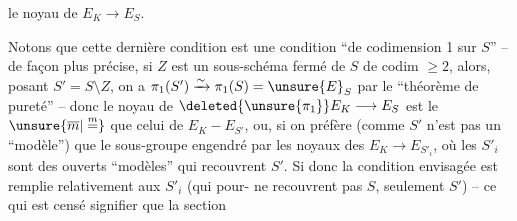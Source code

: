 le noyau de $E_K\longrightarrow E_S$.

Notons que cette dernière condition est une condition ``de codimension 1 sur $S$'' -- de façon plus précise, si $Z$ est un sous-schéma fermé de $S$ de codim $\geq 2$,  alors, posant $S'=S\setminus Z$, on a $\pi_1(S')\xrightarrow{\sim}\pi_1(S)=\unsure{E}_S$ par le ``théorème de pureté'' -- donc le noyau de $\deleted{\unsure{\pi_1}}E_K\longrightarrow E_S$ est le $\unsure{\overline m|\overset{m}{=}}$ que celui de $E_K-E_{S'}$, ou, si on préfère (comme $S'$ n'est pas un ``modèle'') que le sous-groupe  engendré par les noyaux des $E_K\longrightarrow E_{S'_i}$, où les $S'_i$ sont des ouverts ``modèles'' qui recouvrent $S'$. Si donc la condition envisagée est remplie relativement aux $S'_i$ (qui pour- ne recouvrent pas $S$, seulement $S'$) -- ce qui est censé signifier que la section
